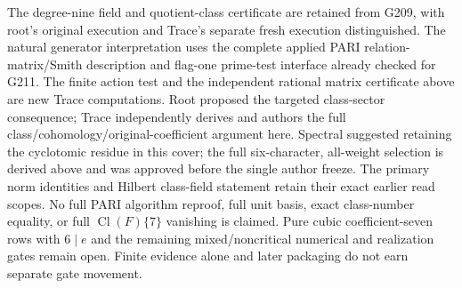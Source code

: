 The degree-nine field and quotient-class certificate are
retained from G209, with root's original execution and
Trace's separate fresh execution distinguished. The natural
generator interpretation uses the complete applied PARI
relation-matrix/Smith description and flag-one prime-test
interface already checked for G211. The finite action test
and the independent rational matrix certificate above are
new Trace computations. Root proposed the targeted
class-sector consequence; Trace independently derives
and authors the full class/cohomology/original-coefficient
argument here. Spectral suggested retaining the cyclotomic
residue in this cover; the full six-character, all-weight
selection is derived above and was approved before the
single author freeze. The primary norm identities and Hilbert
class-field statement retain their exact earlier read scopes.
No full PARI algorithm reproof, full unit basis, exact
class-number equality, or full $\operatorname{Cl}(F)\{7\}$
vanishing is claimed. Pure cubic coefficient-seven rows
with $6\mid e$ and the remaining mixed/noncritical numerical and
realization gates remain open. Finite evidence alone and
later packaging do not earn separate gate movement.
